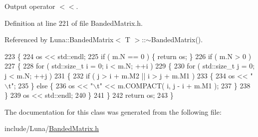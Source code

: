 Output operator $<$$<$. 



Definition at line 221 of file Banded\+Matrix.\+h.



Referenced by Luna\+::\+Banded\+Matrix$<$ T $>$\+::$\sim$\+Banded\+Matrix().


\begin{DoxyCode}
223   \{
224     os << std::endl;
225     \textcolor{keywordflow}{if} ( m.N == 0 ) \{ \textcolor{keywordflow}{return} os; \}
226     \textcolor{keywordflow}{if} ( m.N > 0 )
227     \{
228       \textcolor{keywordflow}{for} ( std::size\_t i = 0; i < m.N; ++i )
229       \{
230         \textcolor{keywordflow}{for} ( std::size\_t j = 0; j < m.N; ++j )
231         \{
232           \textcolor{keywordflow}{if} ( j > i + m.M2 || i > j + m.M1 )
233           \{
234             os << \textcolor{stringliteral}{"\(\backslash\)t"};
235           \} \textcolor{keywordflow}{else} \{
236             os << \textcolor{stringliteral}{"\(\backslash\)t"} << m.COMPACT( i, j - i + m.M1 );
237           \}
238         \}
239         os << std::endl;
240       \}
241     \}
242     \textcolor{keywordflow}{return} os;
243   \}
\end{DoxyCode}


The documentation for this class was generated from the following file\+:\begin{DoxyCompactItemize}
\item 
include/\+Luna/\hyperlink{BandedMatrix_8h}{Banded\+Matrix.\+h}\end{DoxyCompactItemize}
